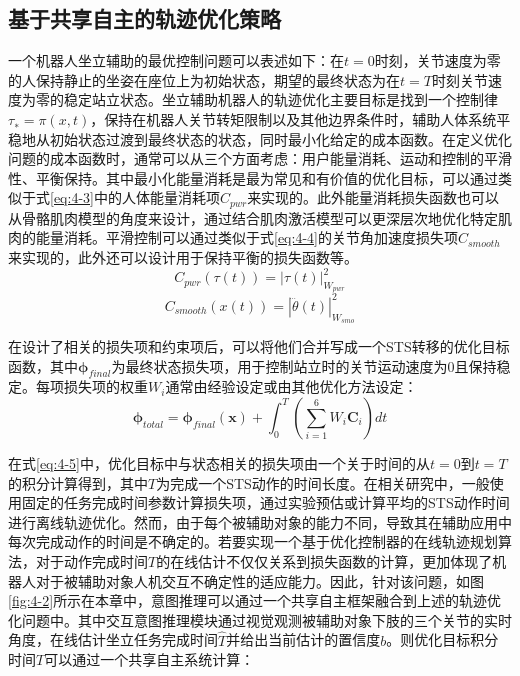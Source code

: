 \subsection{基于共享自主的轨迹优化策略}
一个机器人坐立辅助的最优控制问题可以表述如下：在$t=0$时刻，关节速度为零的人保持静止的坐姿在座位上为初始状态，期望的最终状态为在$t=T$时刻关节速度为零的稳定站立状态。坐立辅助机器人的轨迹优化主要目标是找到一个控制律$τ_∗= π(x,t)$，保持在机器人关节转矩限制以及其他边界条件时，辅助人体系统平稳地从初始状态过渡到最终状态的状态，同时最小化给定的成本函数。在定义优化问题的成本函数时，通常可以从三个方面考虑：用户能量消耗、运动和控制的平滑性、平衡保持。其中最小化能量消耗是最为常见和有价值的优化目标，可以通过类似于式\ref{eq:4-3}中的人体能量消耗项$C_{pwr}$来实现的。此外能量消耗损失函数也可以从骨骼肌肉模型的角度来设计，通过结合肌肉激活模型可以更深层次地优化特定肌肉的能量消耗\cite{kumarPredictingSittoStandAdaptations2022}。平滑控制可以通过类似于式\ref{eq:4-4}的关节角加速度损失项$C_{smooth}$来实现的，此外还可以设计用于保持平衡的损失函数等。
\begin{equation}
    C_{pwr}(\tau(t))=|\tau(t)|_{W_{pwr}}^2
    \label{eq:4-3}
\end{equation}
\begin{equation}
    C_{smooth}(x(t))=|\dddot{\theta}(t)|_{W_{smo}}^2
    \label{eq:4-4}
\end{equation}

在设计了相关的损失项和约束项后，可以将他们合并写成一个STS转移的优化目标函数，其中$\boldsymbol{\phi}_{final}$为最终状态损失项，用于控制站立时的关节运动速度为0且保持稳定。每项损失项的权重$W_i$通常由经验设定或由其他优化方法设定：
\begin{equation}
    \boldsymbol{\phi}_{total}=\boldsymbol{\phi}_{final}(\boldsymbol{x})+\int_0^T\left(\sum_{i=1}^6 W_i \boldsymbol{C}_i\right) dt
    \label{eq:4-5}
\end{equation}

在式\ref{eq:4-5}中，优化目标中与状态相关的损失项由一个关于时间的从$t=0$到$t=T$的积分计算得到，其中$T$为完成一个STS动作的时间长度。在相关研究中，一般使用固定的任务完成时间参数计算损失项，通过实验预估或计算平均的STS动作时间进行离线轨迹优化。然而，由于每个被辅助对象的能力不同，导致其在辅助应用中每次完成动作的时间是不确定的。若要实现一个基于优化控制器的在线轨迹规划算法，对于动作完成时间$T$的在线估计不仅仅关系到损失函数的计算，更加体现了机器人对于被辅助对象人机交互不确定性的适应能力。因此，针对该问题，如图\ref{fig:4-2}所示在本章中，意图推理可以通过一个共享自主框架融合到上述的轨迹优化问题中。其中交互意图推理模块通过视觉观测被辅助对象下肢的三个关节的实时角度，在线估计坐立任务完成时间$\hat T$并给出当前估计的置信度$b$。则优化目标积分时间$T$可以通过一个共享自主系统计算：

